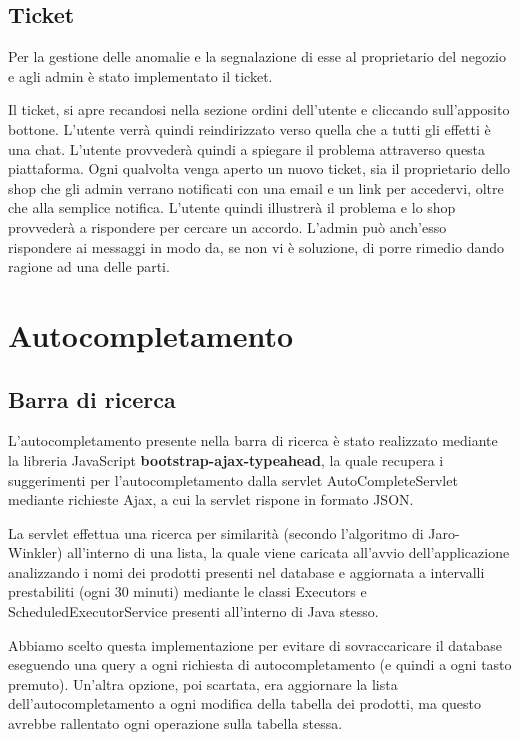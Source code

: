 \section{Ticket}
Per la gestione delle anomalie e la segnalazione di esse al proprietario del negozio e agli admin è stato implementato il ticket.

Il ticket, si apre recandosi nella sezione ordini dell'utente e cliccando sull'apposito bottone.
L'utente verrà quindi reindirizzato verso quella che a tutti gli effetti è una chat.
L'utente provvederà quindi a spiegare il problema attraverso questa piattaforma. Ogni qualvolta venga aperto un nuovo ticket, sia il proprietario dello shop che gli admin verrano notificati con una email e un link per accedervi, oltre che alla semplice notifica. L'utente quindi illustrerà il problema e lo shop provvederà a rispondere per cercare un accordo. L'admin può anch'esso rispondere ai messaggi in modo da, se non vi è soluzione, di porre rimedio dando ragione ad una delle parti.


\chapter{Autocompletamento}

\section{Barra di ricerca}
L'autocompletamento presente nella barra di ricerca è stato realizzato mediante la libreria JavaScript  \textbf{bootstrap-ajax-typeahead}, la quale recupera i suggerimenti per l'autocompletamento dalla servlet AutoCompleteServlet mediante richieste Ajax, a cui la servlet rispone in formato JSON.

La servlet effettua una ricerca per similarità (secondo l'algoritmo di Jaro-Winkler) all'interno di una lista, la quale viene caricata all'avvio dell'applicazione analizzando i nomi dei prodotti presenti nel database e aggiornata a intervalli prestabiliti (ogni 30 minuti) mediante le classi Executors e ScheduledExecutorService presenti all'interno di Java stesso.

Abbiamo scelto questa implementazione per evitare di sovraccaricare il database eseguendo una query a ogni richiesta di autocompletamento (e quindi a ogni tasto premuto).
Un'altra opzione, poi scartata, era aggiornare la lista dell'autocompletamento a ogni modifica della tabella dei prodotti, ma questo avrebbe rallentato ogni operazione sulla tabella stessa.

